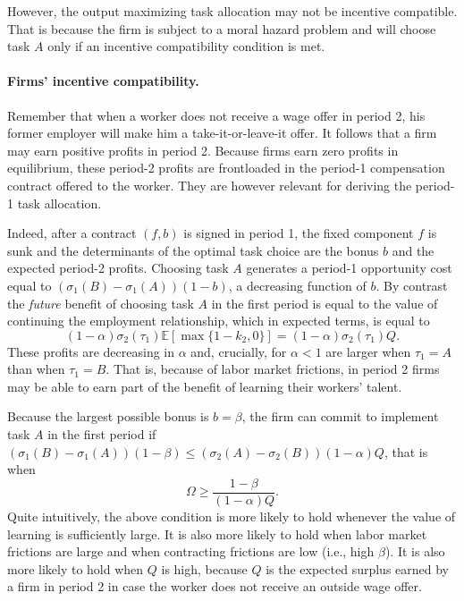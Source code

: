 \documentclass[12pt,american]{paper}
\theoremstyle{remark}
\begin{document}
However, the output maximizing task allocation may not be incentive compatible. That is because the firm is subject to a moral hazard problem and will choose task $A$ only if an incentive compatibility condition is met.

\paragraph{Firms' incentive compatibility.} Remember that when a worker does not receive a wage offer in period 2, his former employer will make him a take-it-or-leave-it offer. It follows that a firm may earn positive profits in period 2. Because firms earn zero profits in equilibrium, these period-2 profits are frontloaded in the period-1 compensation contract offered to the  worker. They are however relevant for deriving the period-1 task allocation. 

Indeed, after a contract $(f,b)$  is signed in period 1, the fixed component $f$ is sunk and the determinants of the optimal task choice are the bonus $b$ and the expected period-2 profits. Choosing task $A$ generates a period-1 opportunity cost equal to $( \sigma_1(B)- \sigma_1(A))(1-b)$, a decreasing function of $b$. By contrast the \textit{future} benefit of choosing task $A$ in the first period is equal to the value of continuing the employment relationship, which in expected terms, is equal to 
\[(1- \alpha) \sigma_2(\tau_1) \mathbb E[\max \{1-k_2,0\}]=(1-\alpha) \sigma_2(\tau_1) Q.\]
These profits are decreasing in $\alpha$ and, crucially, for $\alpha<1$ are larger when $\tau_1=A$ than when $\tau_1=B$. That is, because of labor market frictions, in period 2 firms may be able to earn part of the benefit of learning their workers' talent. 

Because the largest possible bonus  is $b=\beta$,  the firm can commit to implement task $A$ in the first period if $( \sigma_1(B)- \sigma_1(A))(1-\beta) \leq(\sigma_2(A)-\sigma_2(B))(1-\alpha) Q $, that is when
%
\begin{equation}\label{eq: commitment}
\Omega \geq \frac{1-\beta}{(1-\alpha)Q}.
\end{equation}
Quite intuitively, the above condition is more likely to hold whenever the value of learning is sufficiently large. It is also more likely to hold when labor market frictions are large and when contracting frictions are low (i.e., high $\beta$). It is also more likely to hold when $Q$ is high, because $Q$ is the expected surplus earned by a firm in period 2 in case the worker does not receive an outside wage offer.
\end{document}
